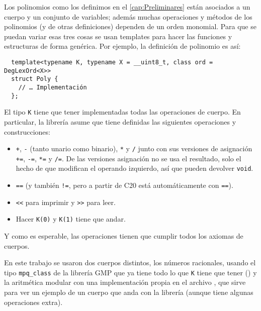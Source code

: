 \documentclass[12pt]{report}
\theoremstyle{customstyle}
\theoremstyle{factstyle}
\newcommand\cppXX{C\nolinebreak[4]\hspace{-.05em}\raisebox{.4ex}{\relsize{-3}{\textbf{++}}}20\xspace}
\begin{document}
Los polinomios como los definimos en el \cref{cap:Preliminares} están asociados a un cuerpo y un conjunto de variables; además muchas operaciones y métodos de los polinomios (y de otras definiciones) dependen de un orden monomial. Para que se puedan variar esas tres cosas se usan templates para hacer las funciones y estructuras de forma genérica. Por ejemplo, la definición de polinomio es así: %

\begin{verbatim}
  template<typename K, typename X = __uint8_t, class ord = DegLexOrd<X>>
  struct Poly {
    // … Implementación
  };
\end{verbatim}

El tipo \texttt{K} tiene que tener implementadas todas las operaciones de cuerpo. En particular, la librería asume que tiene definidas las siguientes operaciones y construcciones:

\begin{itemize}
  \item \texttt{+}, \texttt{-} (tanto unario como binario), \texttt{*} y \texttt{/} junto con sus versiones de asignación \texttt{+=}, \texttt{-=}, \texttt{*=} y \texttt{/=}. De las versiones asignación no se usa el resultado, solo el hecho de que modifican el operando izquierdo, así que pueden devolver \texttt{void}.
  \item \texttt{==} (y también \texttt{!=}, pero a partir de \cppXX está automáticamente con \texttt{==}).
  \item \texttt{<<} para imprimir y \texttt{>>} para leer.
  \item Hacer \texttt{K(0)} y \texttt{K(1)} tiene que andar.
\end{itemize}

Y como es esperable, las operaciones tienen que cumplir todos los axiomas de cuerpos.

En este trabajo se usaron dos cuerpos distintos, los números racionales, usando el tipo \texttt{mpq\_class} de la librería GMP que ya tiene todo lo que \texttt{K} tiene que tener (\cite{lib:gmp}) y la aritmética modular con una implementación propia en el archivo , que sirve para ver un ejemplo de un cuerpo que anda con la librería (aunque tiene algunas operaciones extra).
\end{document}
